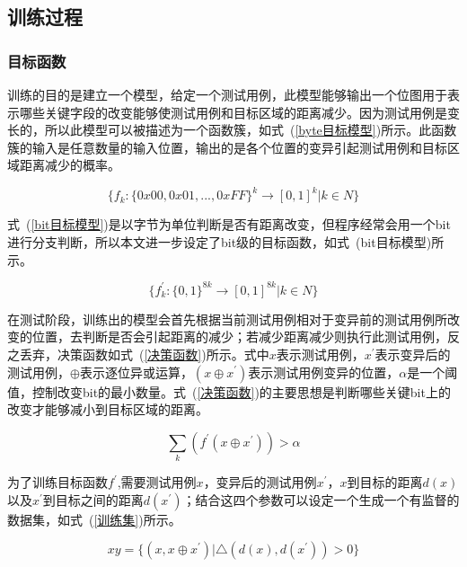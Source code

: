 \subsection{训练过程}

\subsubsection{目标函数}

训练的目的是建立一个模型，给定一个测试用例，此模型能够输出一个位图用于表示哪些关键字段的改变能够使测试用例和目标区域的距离减少。因为测试用例是变长的，所以此模型可以被描述为一个函数簇，如式~(\ref{byte目标模型})所示。此函数簇的输入是任意数量的输入位置，输出的是各个位置的变异引起测试用例和目标区域距离减少的概率。

\begin{equation}\label{byte目标模型}
\{f_{k}: \{0x00, 0x01, ...,0xFF \}^{k} \rightarrow [0,1]^{k} | k \in N \}
\end{equation}

式~(\ref{bit目标模型})是以字节为单位判断是否有距离改变，但程序经常会用一个bit进行分支判断，所以本文进一步设定了bit级的目标函数，如式~(bit目标模型)所示。

\begin{equation}\label{bit目标模型}
\{f^{'}_{k}: \{0,1 \}^{8k} \rightarrow [0,1]^{8k} | k \in N \}
\end{equation}

在测试阶段，训练出的模型会首先根据当前测试用例相对于变异前的测试用例所改变的位置，去判断是否会引起距离的减少；若减少距离减少则执行此测试用例，反之丢弃，决策函数如式~(\ref{决策函数})所示。式中$x$表示测试用例，$x^{'}$表示变异后的测试用例，$\oplus$表示逐位异或运算，$(x \oplus x^{'})$表示测试用例变异的位置，$\alpha$是一个阈值，控制改变bit的最小数量。式~(\ref{决策函数})的主要思想是判断哪些关键bit上的改变才能够减小到目标区域的距离。

\begin{equation}\label{决策函数}
\sum_{k}(f^{'}(x \oplus x^{'})) > \alpha
\end{equation}

为了训练目标函数$f^{'}$,需要测试用例$x$，变异后的测试用例$x^{'}$，$x$到目标的距离$d(x)$以及$x^{'}$到目标之间的距离$d(x^{'})$；结合这四个参数可以设定一个生成一个有监督的数据集，如式~(\ref{训练集})所示。

\begin{equation}\label{训练集}
xy = \{(x, x \oplus x^{'}) | \bigtriangleup (d(x),d(x^{'})) > 0 \}
\end{equation}

